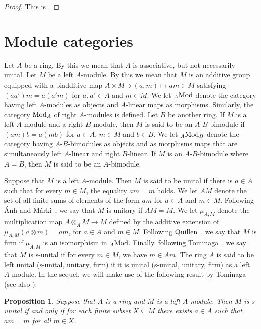 \documentclass[12pt]{amsart}
\newtheorem{prop}[thm]{Proposition}
\theoremstyle{definition}
\newcommand{\Mod}{{\rm Mod}}
\begin{document}
\begin{proof}
This is \cite[Prop. 1.2.2 and Prop. 1.2.3]{nastasescu1989}.
\end{proof}



\section{Module categories}\label{sec:modulecategories}



Let $A$ be a ring. 
By this we mean that $A$ is 
associative, but not necessarily unital.
Let $M$ be a left $A$-module. 
By this we mean
that $M$ is an additive group 
equipped with a biadditive 
map $A \times M \ni (a,m) \mapsto am \in M$
satisfying 
$(aa')m = a(a'm)$ for $a,a' \in A$
and $m \in M$. We let ${}_A \Mod$ denote
the category having left $A$-modules
as objects and $A$-linear maps as
morphisms. Similarly, the category
$\Mod_A$ of right $A$-modules is defined.
Let $B$ be another ring. If $M$ is a
left $A$-module and a right $B$-module, then
$M$ is said to be an $A$-$B$-bimodule if 
$(am)b = a(mb)$ for $a \in A$, $m \in M$ 
and $b \in B$.
We let ${}_A \Mod_B$ denote the category
having $A$-$B$-bimodules as objects and
as morphisms maps that are simultaneously
left $A$-linear and right $B$-linear.
If $M$ is an $A$-$B$-bimodule where
$A = B$, then $M$ is said 
to be an $A$-bimodule.

Suppose that $M$ is a left $A$-module.
Then $M$ is said to be unital
if there is $a \in A$ such that for every
$m \in M$, the equality $am = m$ holds.
We let $AM$
denote the set of all finite sums 
of elements of the form $am$ for $a \in A$
and $m \in M$. 
Following \'{A}nh and 
M\'{a}rki~\cite{anh1987}, 
we say that $M$ is
unitary if $AM = M$.
We let $\mu_{A,M}$ denote the 
multiplication map 
$A \otimes_A M \to M$ defined by 
the additive extension of
$\mu_{A,M}(a \otimes m) = am$,
for $a \in A$ and $m \in M$.
Following Quillen~\cite{quillen1997}, 
we say that $M$ is  
firm if $\mu_{A,M}$ is an 
isomorphism in ${}_A \Mod$.
Finally, following 
Tominaga~\cite{tominaga1976},
we say that $M$ is s-unital if
for every $m \in M$, we have $m \in Am$. 
The ring $A$ is said to be left unital
(s-unital, unitary, firm) if it is 
unital (s-unital, unitary, firm) as a
left $A$-module.
In the sequel, 
we will make use of the following result
by Tominaga \cite[Thm. 1]{tominaga1976}
(see also \cite{nystedt2019}):

\begin{prop}\label{prop:sunitalequivalent}
Suppose that $A$ is a ring and 
$M$ is a left $A$-module.
Then $M$ is s-unital if and only
if for each finite subset $X \subseteq M$
there exists $a \in A$ such that 
$a m = m$ for all $m \in X$.
\end{prop}
\end{document}
